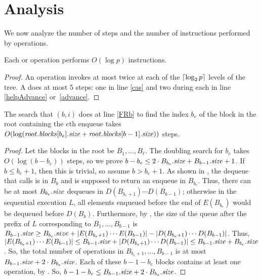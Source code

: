 
\section{Analysis}
We now analyze the number of steps and the number of  instructions performed by operations.

\begin{proposition}\label{casbound}
Each  or  operation performs $O(\log p)$  instructions.
\end{proposition}
\begin{proof}
An operation invokes  at most twice at each of the $\lceil \log_2 p \rceil$ levels of the tree.
A  does at most 5  steps: one in line \ref{cas} and two during each  in line \ref{helpAdvance} or~\ref{advance}.
\end{proof}



\begin{lemma}\label{dSearchTime}
The search that $(b,i)$ does at line \ref{FRb} to find the index $b_e$ of the block in the root containing the $e$th enqueue takes $O(\log (\mbox{\textnormal{\textit{root}}}.\mbox{\textit{blocks}}[b_e].\mbox{\textit{size}} + \mbox{\textnormal{\textit{root}}}.\mbox{\textit{blocks}}[b-1].\mbox{\textit{size}}))$ steps.
\end{lemma}
\begin{proof}
Let the blocks in the root be $B_1, \ldots, B_\ell$.
The doubling search for $b_e$ takes $O(\log (b-b_e))$ steps,
so we prove $b - b_e \leq 2 \cdot B_{b_e}.\mbox{\textit{size}} + B_{b-1}.\mbox{\textit{size}} + 1$.
If $b \leq b_e+1$, then this is trivial, so assume  $b>b_e+1$.
%
As shown in , the dequeue that calls  is in $B_b$ and is supposed to return an enqueue in $B_{b_e}$.
Thus, there can be at most $B_{b_e}.\mbox{\textit{size}}$ dequeues in 
$D(B_{b_e+1}) \cdots D(B_{b-1})$; otherwise in the sequential execution $L$,
all elements enqueued before the end of
$E(B_{b_e})$ would be dequeued before $D(B_b)$. 
Furthermore, by , the size of the queue  after the prefix of $L$ corresponding to 
$B_1,\ldots,B_{b-1}$  is 
$B_{b-1}.\mbox{\textit{size}} \geq B_{b_e}.size + |E(B_{b_e+1})\cdots E(B_{b-1})| - |D(B_{b_e+1})\cdots D(B_{b-1})|$.
Thus, $|E(B_{b_e+1})\cdots E(B_{b-1})| \leq B_{b-1}.\mbox{\textit{size}} + |D(B_{b_e+1})\cdots D(B_{b-1})| \leq B_{b-1}.\mbox{\textit{size}} + B_{b_e}.\mbox{\textit{size}}$.
So, the total number of operations in $B_{b_e+1}, \ldots, B_{b-1}$ is at most
$B_{b-1}.\mbox{\textit{size}} + 2\cdot B_{b_e}.\mbox{\textit{size}}$.
Each of these $b-1-b_e$ blocks contains at least one operation, by .
So, $b-1-b_e \leq B_{b-1}.\mbox{\textit{size}} + 2\cdot B_{b_e}.\mbox{\textit{size}}$.
\end{proof}

